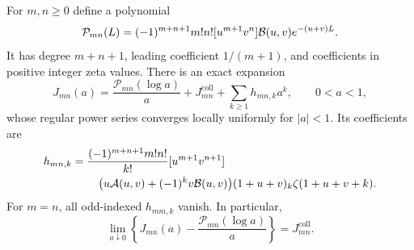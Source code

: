 \begin{theorem}
\label{scoll:thm:collision}
For $m,n\ge0$ define a polynomial
\begin{equation}
 \mathcal P_{mn}(L)=(-1)^{m+n+1}m!n!
       [u^{m+1}v^n]\mathcal B(u,v)e^{-(u+v)L}.
 \label{scoll:eq:collision-polynomial}
\end{equation}
It has degree $m+n+1$, leading coefficient $1/(m+1)$, and coefficients
in positive integer zeta values. There is an exact expansion
\begin{equation}
 J_{mn}(a)=\frac{\mathcal P_{mn}(\log a)}a
                +J_{mn}^{\mathrm{coll}}+\sum_{k\ge1}h_{mn,k}a^k,
 \qquad 0<a<1,
 \label{scoll:eq:collision-series}
\end{equation}
whose regular power series converges locally uniformly for $|a|<1$.
Its coefficients are
\begin{align}
 h_{mn,k}={}&\frac{(-1)^{m+n+1}m!n!}{k!}
 [u^{m+1}v^{n+1}]\notag\\
 &\quad\bigl(u\mathcal A(u,v)+(-1)^kv\mathcal B(u,v)\bigr)
               (1+u+v)_k\zeta(1+u+v+k).
 \label{scoll:eq:collision-coefficients}
\end{align}
For $m=n$, all odd-indexed $h_{mm,k}$ vanish. In particular,
\begin{equation}
 \lim_{a\downarrow0}\left\{J_{mn}(a)
             -\frac{\mathcal P_{mn}(\log a)}a\right\}=J_{mn}^{\mathrm{coll}}.
 \label{scoll:eq:collision-limit}
\end{equation}
\end{theorem}
